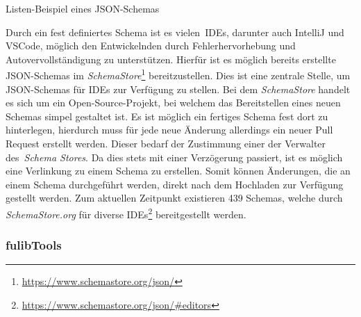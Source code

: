 \begin{listing}[!ht]
    \inputminted{json}{listings/2.2.1/list.schema.json}
    \caption{Listen-Beispiel eines JSON-Schemas}
    \label{listing:listSchema}
\end{listing}

Durch ein fest definiertes Schema ist es vielen~\acp{IDE}, darunter auch IntelliJ und VSCode,
möglich den Entwickelnden durch Fehlerhervorhebung und Autovervollständigung zu unterstützen.
Hierfür ist es möglich bereits erstellte JSON-Schemas im \textit{SchemaStore}\footnote{\url{https://www.schemastore.org/json/}} bereitzustellen.
Dies ist eine zentrale Stelle, um JSON-Schemas für \acp{IDE} zur Verfügung zu stellen.
Bei dem \textit{SchemaStore} handelt es sich um ein Open-Source-Projekt, bei welchem das Bereitstellen eines neuen Schemas simpel gestaltet ist.
Es ist möglich ein fertiges Schema fest dort zu hinterlegen, hierdurch muss für jede neue Änderung allerdings ein neuer Pull Request erstellt werden.
Dieser bedarf der Zustimmung einer der Verwalter des~\textit{Schema Stores}.
Da dies stets mit einer Verzögerung passiert, ist es möglich eine Verlinkung zu einem Schema zu erstellen.
Somit können Änderungen, die an einem Schema durchgeführt werden, direkt nach dem Hochladen zur Verfügung gestellt werden.
Zum aktuellen Zeitpunkt existieren 439 Schemas, welche durch \textit{SchemaStore.org} für diverse \acp{IDE}\footnote{\url{https://www.schemastore.org/json/#editors}}
bereitgestellt werden\cite*{schemaStore}.

\subsubsection{fulibTools}

